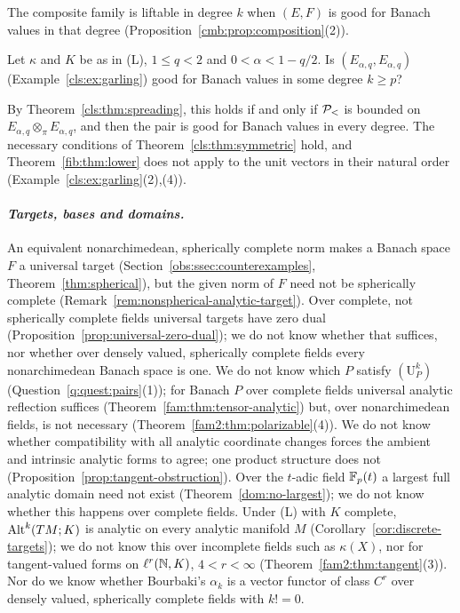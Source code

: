 The composite family is liftable in degree $k$ when $(E,F)$ is good for Banach values in that degree
(Proposition~\ref{cmb:prop:composition}(2)).

\begin{question}\label{q:quest:garling}
Let $\kappa$ and $K$ be as in \textup{(L)}, $1\le q<2$ and $0<\alpha<1-q/2$. Is $(E_{\alpha,q},E_{\alpha,q})$
(Example~\ref{cls:ex:garling}) good for Banach values in some degree $k\ge p$?
\end{question}

By Theorem~\ref{cls:thm:spreading}, this holds if and only if $\mathcal P_<$ is bounded on $E_{\alpha,q}\otimes_\pi E_{\alpha,q}$,
and then the pair is good for Banach values in every degree. The necessary conditions of Theorem~\ref{cls:thm:symmetric}
hold, and Theorem~\ref{fib:thm:lower} does not apply to the unit vectors in their natural order
(Example~\ref{cls:ex:garling}(2),(4)).

\paragraph{\textit{Targets, bases and domains.}}
An equivalent nonarchimedean, spherically complete norm makes a Banach space $F$ a universal target
(Section~\ref{obs:ssec:counterexamples}, Theorem~\ref{thm:spherical}), but the given norm of $F$ need not be spherically
complete (Remark~\ref{rem:nonspherical-analytic-target}). Over complete, not spherically complete fields universal targets have
zero dual (Proposition~\ref{prop:universal-zero-dual}); we do not know whether that suffices, nor whether over densely
valued, spherically complete fields every nonarchimedean Banach space is one. We do not know which $P$ satisfy
$(\mathrm U^k_P)$ (Question~\ref{q:quest:pairs}(1)); for Banach $P$ over complete fields universal analytic reflection
suffices (Theorem~\ref{fam:thm:tensor-analytic}) but, over nonarchimedean fields, is not necessary
(Theorem~\ref{fam2:thm:polarizable}(4)). We do not know whether compatibility with all analytic coordinate changes forces
the ambient and intrinsic analytic forms to agree; one product structure does not
(Proposition~\ref{prop:tangent-obstruction}). Over the $t$-adic field $\mathbb F_p(t)$ a largest full analytic domain need not
exist (Theorem~\ref{dom:no-largest}); we do not know whether this happens over complete fields. Under \textup{(L)} with
$K$ complete, $\operatorname{Alt}^k(TM;K)$ is analytic on every analytic manifold $M$ (Corollary~\ref{cor:discrete-targets}); we do
not know this over incomplete fields such as $\kappa(X)$, nor for tangent-valued forms on $\ell^r(\mathbb N,K)$, $4<r<\infty$
(Theorem~\ref{fam2:thm:tangent}(3)). Nor do we know whether Bourbaki's $\alpha_k$ is a vector functor of class $C^r$
over densely valued, spherically complete fields with $k!=0$.

